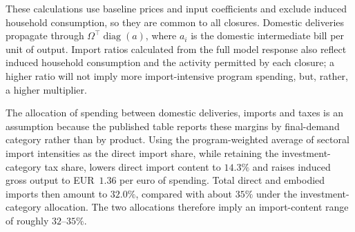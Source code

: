 These calculations use baseline prices and input coefficients and exclude induced household consumption, so they are common to all closures. Domestic deliveries propagate through $\Omega^{\top}\operatorname{diag}(a)$, where $a_i$ is the domestic intermediate bill per unit of output. Import ratios calculated from the full model response also reflect induced household consumption and the activity permitted by each closure; a higher ratio will not imply more import-intensive program spending, but, rather, a higher multiplier.

The allocation of spending between domestic deliveries, imports and taxes is an assumption because the published table reports these margins by final-demand category rather than by product. Using the program-weighted average of sectoral import intensities as the direct import share, while retaining the investment-category tax share, lowers direct import content to $14.3\%$ and raises induced gross output to EUR~$1.36$ per euro of spending. Total direct and embodied imports then amount to $32.0\%$, compared with about $35\%$ under the investment-category allocation. The two allocations therefore imply an import-content range of roughly $32$--$35\%$.


